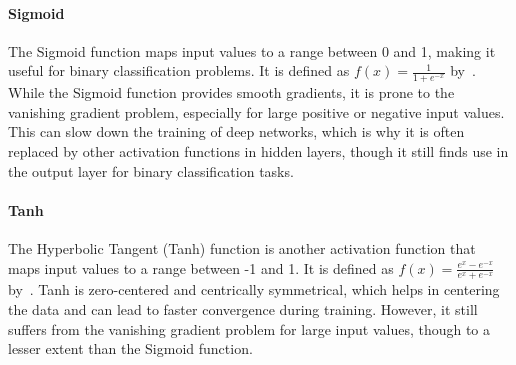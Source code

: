 \paragraph{Sigmoid}\label{par:sigmoid}
The Sigmoid function maps input values to a range between 0 and 1,
making it useful for binary classification problems.
It is defined as \( f(x) = \frac{1}{1 + e^{-x}} \) by~\cite{sharma2017activation}.
While the Sigmoid function provides smooth gradients,
it is prone to the vanishing gradient problem,
especially for large positive or negative input values.
This can slow down the training of deep networks,
which is why it is often replaced by other activation
functions in hidden layers,
though it still finds use in the output layer for binary classification tasks.

\paragraph{Tanh}\label{par:tanh}
The Hyperbolic Tangent (Tanh) function is another activation function that maps input values to a range between -1 and 1.
It is defined as  \( f(x) = \frac{e^x - e^{-x}}{e^x + e^{-x}} \) by~\cite{sharma2017activation}.
Tanh is zero-centered and centrically symmetrical, which helps in centering the data and can lead to faster convergence during training.
However, it still suffers from the vanishing gradient problem for large input values, though to a lesser extent than the Sigmoid function.